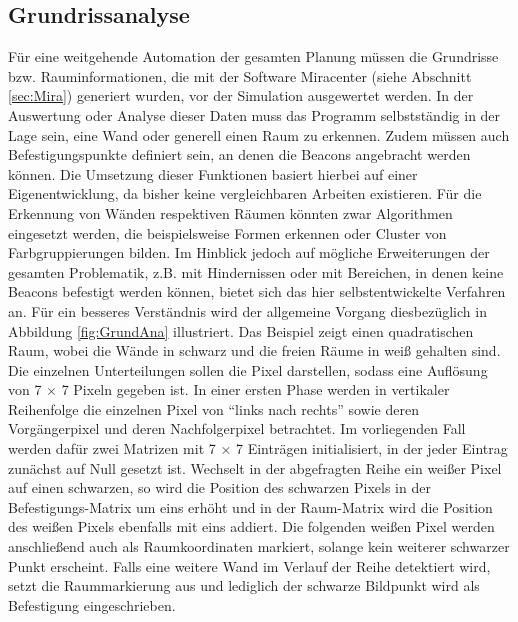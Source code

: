 \subsection{Grundrissanalyse}
Für eine weitgehende Automation der gesamten Planung müssen die Grundrisse bzw. Rauminformationen, die mit der Software Miracenter (siehe Abschnitt \ref{sec:Mira}) generiert wurden, vor der Simulation ausgewertet werden. In der Auswertung oder Analyse dieser Daten muss das Programm selbstständig in der Lage sein, eine Wand oder generell einen Raum zu erkennen. Zudem müssen auch Befestigungspunkte definiert sein, an denen die Beacons angebracht werden können. Die Umsetzung dieser Funktionen basiert hierbei auf einer Eigenentwicklung, da bisher keine vergleichbaren Arbeiten existieren. Für die Erkennung von Wänden respektiven Räumen könnten zwar Algorithmen eingesetzt werden, die beispielsweise Formen erkennen oder Cluster von Farbgruppierungen bilden. Im Hinblick jedoch auf mögliche Erweiterungen der gesamten Problematik, z.B. mit Hindernissen oder mit Bereichen, in denen keine Beacons befestigt werden können, bietet sich das hier selbstentwickelte Verfahren an. Für ein besseres Verständnis wird der allgemeine Vorgang diesbezüglich in Abbildung \ref{fig:GrundAna} illustriert. Das Beispiel zeigt einen quadratischen Raum, wobei die Wände in schwarz und die freien Räume in weiß gehalten sind. Die einzelnen Unterteilungen sollen die Pixel darstellen, sodass eine Auflösung von 7 $\times$ 7 Pixeln gegeben ist. In einer ersten Phase werden in vertikaler Reihenfolge die einzelnen Pixel von "`links nach rechts"' sowie deren Vorgängerpixel und deren Nachfolgerpixel betrachtet. Im vorliegenden Fall werden dafür zwei Matrizen mit 7 $\times$ 7 Einträgen initialisiert, in der jeder Eintrag zunächst auf Null gesetzt ist. Wechselt in der abgefragten Reihe ein weißer Pixel auf einen schwarzen, so wird die Position des schwarzen Pixels in der Befestigungs-Matrix um eins erhöht und in der Raum-Matrix wird die Position des weißen Pixels ebenfalls mit eins addiert. Die folgenden weißen Pixel werden anschließend auch als Raumkoordinaten markiert, solange kein weiterer schwarzer Punkt erscheint. Falls eine weitere Wand im Verlauf der Reihe detektiert wird, setzt die Raummarkierung aus und lediglich der schwarze Bildpunkt wird als Befestigung eingeschrieben. \\ \\
